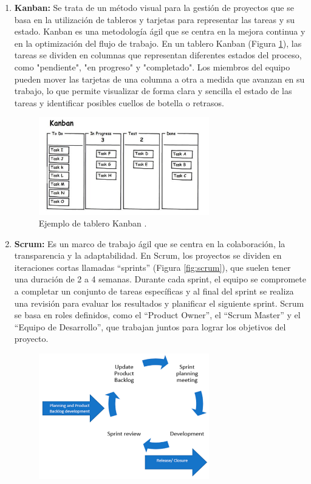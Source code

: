\begin{enumerate}
    \item \textbf{Kanban:} Se trata de un método visual para la gestión de proyectos que se basa en la utilización de tableros y tarjetas para representar las tareas y su estado. Kanban es una metodología ágil que se centra en la mejora continua y en la optimización del flujo de trabajo. En un tablero Kanban (Figura \ref{fig:kanban}), las tareas se dividen en columnas que representan diferentes estados del proceso, como "pendiente", "en progreso" y "completado". Los miembros del equipo pueden mover las tarjetas de una columna a otra a medida que avanzan en su trabajo, lo que permite visualizar de forma clara y sencilla el estado de las tareas y identificar posibles cuellos de botella o retrasos.
    \begin{figure}[H]
        \centering
        \includegraphics[width=0.7\textwidth]{imagenes/kanban.png}
        \caption{Ejemplo de tablero Kanban \cite{kirovska2015usage}.}
        \label{fig:kanban}
    \end{figure}
    \item \textbf{Scrum:} Es un marco de trabajo ágil que se centra en la colaboración, la transparencia y la adaptabilidad. En Scrum, los proyectos se dividen en iteraciones cortas llamadas ``sprints'' (Figura \ref{fig:scrum}), que suelen tener una duración de 2 a 4 semanas. Durante cada sprint, el equipo se compromete a completar un conjunto de tareas específicas y al final del sprint se realiza una revisión para evaluar los resultados y planificar el siguiente sprint. Scrum se basa en roles definidos, como el ``Product Owner'', el ``Scrum Master'' y el ``Equipo de Desarrollo'', que trabajan juntos para lograr los objetivos del proyecto.
    \begin{figure}[H]
        \centering
        \includegraphics[width=0.7\textwidth]{imagenes/scrum.png}

\end{figure}
\end{enumerate}
